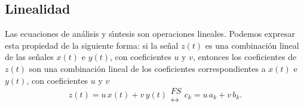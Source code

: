 \subsection{Linealidad}

Las ecuaciones de an\'{a}lisis y s\'{\i}ntesis son operaciones
lineales. Podemos expresar esta propiedad de la siguiente forma: 
si la se\~{n}al $z(t)$ es una combinaci\'{o}n lineal de las
se\~{n}ales $x(t)$ e $y(t)$, con coeficientes $u$ y $v$, 
entonces los coeficientes de $z(t)$ son una combinaci\'{o}n lineal 
de los coeficientes correspondientes a $x(t)$ e $y(t)$, 
con coeficientes $u$ y $v$
\begin{equation}
z\left( t\right) = u \, x\left( t\right) + v \, y\left( t \right) 
\begin{array}{l}
FS \\ 
\longleftrightarrow
\end{array}
c_{k}=u \, a_{k} + v \, b_{k}.
\end{equation}

